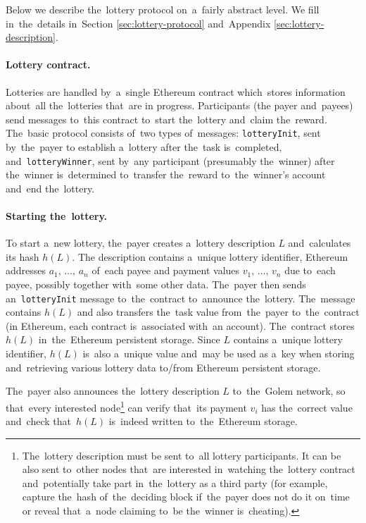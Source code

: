 \documentclass[a4paper]{article}
\begin{document}
    Below we describe the~lottery protocol on~a~fairly abstract level. We fill in~the~details in~Section
    \ref{sec:lottery-protocol} and~Appendix \ref{sec:lottery-description}.

    \paragraph{Lottery contract.}
    Lotteries are handled by~a~single Ethereum contract which~stores information about~all the~lotteries that~are in
    progress. Participants (the payer and~payees) send messages to~this contract to~start the~lottery and~claim
    the~reward. The~basic protocol consists of~two types of~messages: \texttt{lotteryInit}, sent by~the~payer to
    establish a~lottery after the~task is~completed, and~\texttt{lotteryWinner}, sent by~any participant
    (presumably the~winner) after the~winner is~determined to~transfer the~reward to~the~winner's account and~end
    the~lottery.

    \paragraph{Starting the~lottery.}
    To start a~new lottery, the~payer creates a~lottery description $L$ and~calculates its hash $h(L)$. The
    description contains a~unique lottery identifier, Ethereum addresses $a_1,\,\ldots,\,a_n$ of~each payee and
    payment values $v_1,\,\ldots,\,v_n$ due to~each payee, possibly together with~some other data. The~payer then
    sends an~\texttt{lotteryInit} message to~the~contract to~announce the~lottery. The~message contains $h(L)$ and
    also transfers the~task value from~the~payer to~the~contract (in Ethereum, each contract is~associated with~an
    account). The~contract stores $h(L)$ in~the~Ethereum persistent storage. Since $L$ contains a~unique lottery
    identifier, $h(L)$ is~also a~unique value and~may be used as a~key when storing and~retrieving various lottery
    data to/from Ethereum persistent storage.

    The~payer also announces the~lottery description $L$ to~the~Golem network, so that~every interested
    node\footnote{ The~lottery description must be sent to~all lottery participants. It can be also sent to~other
    nodes that~are interested in~watching the~lottery contract and~potentially take part in~the~lottery as a
    third party (for example, capture the~hash of~the~deciding block if~the~payer does not do it on~time or reveal
    that~a~node claiming to~be the~winner is~cheating).}
    can verify that~its payment $v_i$ has the~correct value and~check that~$h(L)$ is~indeed written to~the~Ethereum
    storage.
\end{document}
